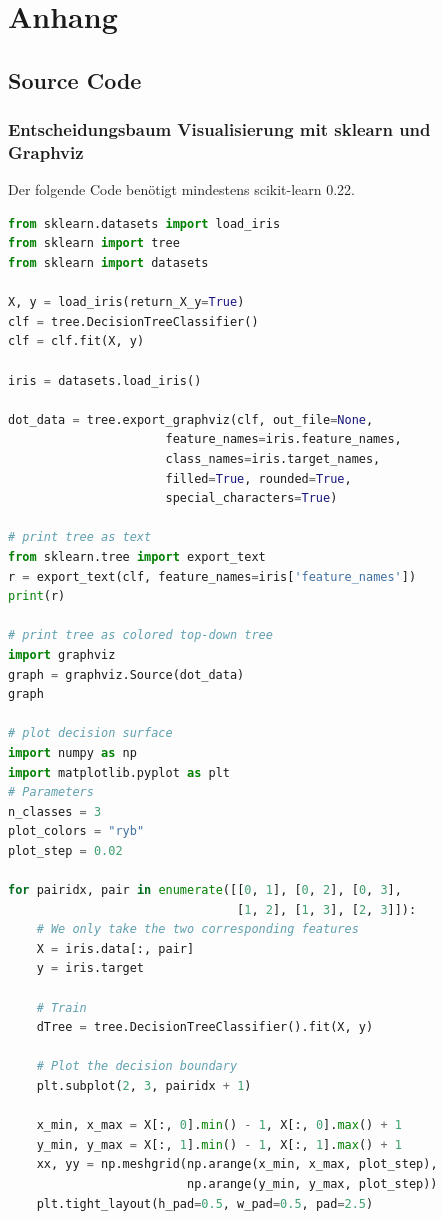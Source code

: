 \documentclass[
  12pt, %
  a4paper, %
  oneside, %
  openany, 
  numbers=noenddot, %
  BCOR=5mm, %
  parskip=half*, %
  thesis, %
]{bfhbook}
\begin{document}
\chapter{Anhang}
\section*{Source Code}
\label{dt-vis}

\subsection*{Entscheidungsbaum Visualisierung mit sklearn und Graphviz}
Der folgende Code benötigt mindestens scikit-learn 0.22.
\begin{lstlisting}[language=Python, caption=Decision Tree Visualisierung]
from sklearn.datasets import load_iris
from sklearn import tree
from sklearn import datasets

X, y = load_iris(return_X_y=True)
clf = tree.DecisionTreeClassifier()
clf = clf.fit(X, y)

iris = datasets.load_iris()

dot_data = tree.export_graphviz(clf, out_file=None, 
                      feature_names=iris.feature_names,  
                      class_names=iris.target_names,  
                      filled=True, rounded=True,  
                      special_characters=True)  

# print tree as text
from sklearn.tree import export_text
r = export_text(clf, feature_names=iris['feature_names'])
print(r)

# print tree as colored top-down tree
import graphviz
graph = graphviz.Source(dot_data)  
graph 

# plot decision surface
import numpy as np
import matplotlib.pyplot as plt
# Parameters
n_classes = 3
plot_colors = "ryb"
plot_step = 0.02

for pairidx, pair in enumerate([[0, 1], [0, 2], [0, 3],
                                [1, 2], [1, 3], [2, 3]]):
    # We only take the two corresponding features
    X = iris.data[:, pair]
    y = iris.target
    
    # Train
    dTree = tree.DecisionTreeClassifier().fit(X, y)

    # Plot the decision boundary
    plt.subplot(2, 3, pairidx + 1)

    x_min, x_max = X[:, 0].min() - 1, X[:, 0].max() + 1
    y_min, y_max = X[:, 1].min() - 1, X[:, 1].max() + 1
    xx, yy = np.meshgrid(np.arange(x_min, x_max, plot_step),
                         np.arange(y_min, y_max, plot_step))
    plt.tight_layout(h_pad=0.5, w_pad=0.5, pad=2.5)


\end{lstlisting}
\end{document}
